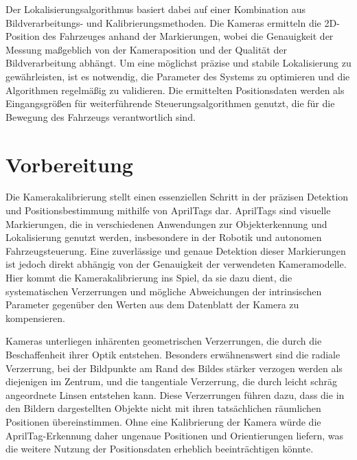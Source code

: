 \documentclass[ngerman]{article}    %
\theoremstyle{definition}
\begin{document}
Der Lokalisierungsalgorithmus basiert dabei auf einer Kombination aus Bildverarbeitungs- und Kalibrierungsmethoden. Die Kameras ermitteln die 2D-Position des Fahrzeuges anhand der Markierungen, wobei die Genauigkeit der Messung maßgeblich von der Kameraposition und der Qualität der Bildverarbeitung abhängt. Um eine möglichst präzise und stabile Lokalisierung zu gewährleisten, ist es notwendig, die Parameter des Systems zu optimieren und die Algorithmen regelmäßig zu validieren. Die ermittelten Positionsdaten werden als Eingangsgrößen für weiterführende Steuerungsalgorithmen genutzt, die für die Bewegung des Fahrzeugs verantwortlich sind.


\newpage
\section{Vorbereitung}

Die Kamerakalibrierung stellt einen essenziellen Schritt in der präzisen Detektion und Positionsbestimmung mithilfe von AprilTags dar. AprilTags sind visuelle Markierungen, die in verschiedenen Anwendungen zur Objekterkennung und Lokalisierung genutzt werden, insbesondere in der Robotik und autonomen Fahrzeugsteuerung. Eine zuverlässige und genaue Detektion dieser Markierungen ist jedoch direkt abhängig von der Genauigkeit der verwendeten Kameramodelle. Hier kommt die Kamerakalibrierung ins Spiel, da sie dazu dient, die systematischen Verzerrungen und mögliche Abweichungen der intrinsischen Parameter gegenüber den Werten aus dem Datenblatt der Kamera zu kompensieren.

Kameras unterliegen inhärenten geometrischen Verzerrungen, die durch die Beschaffenheit ihrer Optik entstehen. Besonders erwähnenswert sind die radiale Verzerrung, bei der Bildpunkte am Rand des Bildes stärker verzogen werden als diejenigen im Zentrum, und die tangentiale Verzerrung, die durch leicht schräg angeordnete Linsen entstehen kann. Diese Verzerrungen führen dazu, dass die in den Bildern dargestellten Objekte nicht mit ihren tatsächlichen räumlichen Positionen übereinstimmen. Ohne eine Kalibrierung der Kamera würde die AprilTag-Erkennung daher ungenaue Positionen und Orientierungen liefern, was die weitere Nutzung der Positionsdaten erheblich beeinträchtigen könnte.
\end{document}
